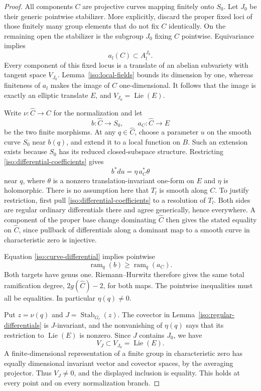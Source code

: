 \begin{proof}
All components \(C\) are projective curves mapping finitely onto
\(S_0\).  Let \(J_0\) be their generic pointwise stabilizer.
More explicitly, discard the proper fixed loci of those finitely
many group elements that do not fix \(C\) identically.
On the remaining open the stabilizer is the subgroup \(J_0\)
fixing \(C\) pointwise.
Equivariance implies
\[
                         a_l(C)\subset A_l^{J_0}.
\]
Every component of this fixed locus is a translate of an abelian
subvariety with tangent space \(V_{J_0}\).
Lemma~\ref{iso:local-fields} bounds its dimension by one, whereas
finiteness of \(a_l\) makes the image of \(C\) one-dimensional.
It follows that the image is exactly an elliptic translate \(E\),
and \(V_{J_0}=\operatorname{Lie}(E)\).

Write \(\nu:\widehat C\to C\) for the normalization and let
\[
           b:\widehat C\to S_0,\qquad
           a_C:\widehat C\to E
\]
be the two finite morphisms.
At any \(q\in\widehat C\), choose a parameter \(u\) on the smooth
curve \(S_0\) near \(b(q)\), and extend it to a local function on
\(B\).  Such an extension exists because \(S_0\) has its reduced
closed-subspace structure.
Restricting \eqref{iso:differential-coefficients} gives
\begin{equation}\label{iso:curve-differential}
                          b^*du=\eta\,a_C^*\theta
\end{equation}
near \(q\), where \(\theta\) is a nonzero translation-invariant
one-form on \(E\) and \(\eta\) is holomorphic.
There is no assumption here that \(T_l\) is smooth along \(C\).
To justify restriction, first pull
\eqref{iso:differential-coefficients} to a resolution of \(T_l\).
Both sides are regular ordinary differentials there and agree
generically, hence everywhere.  A component of the proper base
change dominating \(\widehat C\) then gives the stated equality
on \(\widehat C\), since pullback of differentials along a dominant
map to a smooth curve in characteristic zero is injective.

Equation \eqref{iso:curve-differential} implies pointwise
\[
                       \operatorname{ram}_q(b)
                          \ge\operatorname{ram}_q(a_C).
\]
Both targets have genus one.  Riemann--Hurwitz therefore gives
the same total ramification degree, \(2g(\widehat C)-2\), for
both maps.  The pointwise inequalities must all be equalities.
In particular \(\eta(q)\ne0\).

Put \(z=\nu(q)\) and \(J=\operatorname{Stab}_{G_l}(z)\).
The covector in Lemma~\ref{iso:regular-differentials} is
\(J\)-invariant, and the nonvanishing of \(\eta(q)\) says that
its restriction to \(\operatorname{Lie}(E)\) is nonzero.
Since \(J\) contains \(J_0\), we have
\[
                         V_J\subset V_{J_0}
                                      =\operatorname{Lie}(E).
\]
A finite-dimensional representation of a finite group in
characteristic zero has equally dimensional invariant vector
and covector spaces, by the averaging projector.
Thus \(V_J\ne0\), and the displayed inclusion is equality.
This holds at every point and on every normalization branch.


\end{proof}

